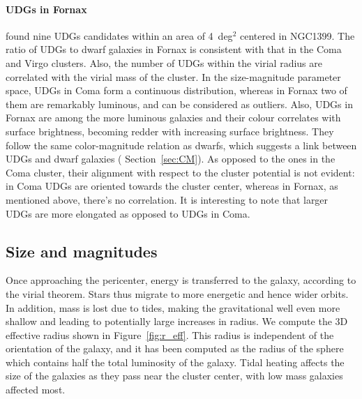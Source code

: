 \paragraph{UDGs in Fornax}
\citet{Venhola2017} found nine UDGs candidates within an area of 4~deg$^2$ centered in NGC1399.
The ratio of UDGs to dwarf galaxies in Fornax is consistent with that in the Coma and Virgo clusters.
Also, the number of UDGs within the virial radius are correlated with the virial mass of the cluster.
In the size-magnitude parameter space, UDGs in Coma form a continuous distribution, whereas in Fornax two of them are  remarkably luminous, and can be considered as outliers.
Also, UDGs in Fornax are among the more luminous galaxies and their colour correlates with surface brightness, becoming redder with increasing surface brightness.
They follow the same color-magnitude relation as dwarfs, which suggests a link between UDGs and dwarf galaxies  (\cf{} Section~\ref{sec:CM}).
As opposed to the ones in the Coma cluster, their alignment with respect to the cluster potential is not evident: in Coma UDGs are oriented towards the cluster center, whereas in Fornax, as mentioned above, there's no correlation.
It is interesting to note that larger UDGs are more elongated as opposed to UDGs in Coma.

\subsection{Size and magnitudes}
Once approaching the pericenter, energy is transferred to the galaxy, according to the virial theorem.
Stars thus migrate to more energetic and hence wider orbits.
In addition, mass is lost due to tides, making the gravitational well even more shallow and leading to potentially large increases in radius.
We compute the 3D effective radius shown in Figure~\ref{fig:r_eff}.
This radius is independent of the orientation of the galaxy, and it has been computed as the radius of the sphere which contains half the total luminosity of the galaxy.
Tidal heating affects the size of the galaxies as they pass near the cluster center, with low mass galaxies affected most.


